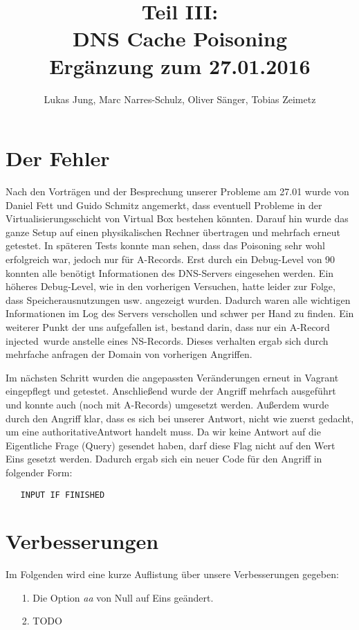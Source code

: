 \documentclass[10pt,a4paper]{article}
\author{Lukas Jung, Marc Narres-Schulz, Oliver Sänger, Tobias Zeimetz}
\title{Teil III: \\DNS Cache Poisoning \\Ergänzung zum 27.01.2016}
\begin{document}
\maketitle
\newpage

\section{Der Fehler}
Nach den Vorträgen und der Besprechung unserer Probleme am 27.01 wurde von Daniel Fett und Guido Schmitz angemerkt, dass eventuell Probleme in der Virtualisierungsschicht von Virtual Box bestehen könnten. Darauf hin wurde das ganze Setup auf einen physikalischen Rechner übertragen und mehrfach erneut getestet. In späteren Tests konnte man sehen, dass das Poisoning sehr wohl erfolgreich war, jedoch nur für A-Records. Erst durch ein Debug-Level von 90 konnten alle benötigt Informationen des DNS-Servers eingesehen werden. Ein höheres Debug-Level, wie in den vorherigen Versuchen, hatte leider zur Folge, dass Speicherausnutzungen usw. angezeigt wurden. Dadurch waren alle wichtigen Informationen im Log des Servers verschollen und schwer per Hand zu finden. Ein weiterer Punkt der uns aufgefallen ist, bestand darin, dass nur ein A-Record \glqq injected\grqq\ wurde anstelle eines NS-Records. Dieses verhalten ergab sich durch mehrfache anfragen der Domain von vorherigen Angriffen. 

Im nächsten Schritt wurden die angepassten Veränderungen erneut in Vagrant eingepflegt und getestet. Anschließend wurde der Angriff mehrfach ausgeführt und konnte auch (noch mit A-Records) umgesetzt werden. Außerdem wurde durch den Angriff klar, dass es sich bei unserer Antwort, nicht wie zuerst gedacht, um eine \glqq authoritative\grqq Antwort handelt muss. Da wir keine Antwort auf die Eigentliche Frage (Query) gesendet haben, darf diese Flag nicht auf den Wert Eins gesetzt werden. Dadurch ergab sich ein neuer Code für den Angriff in folgender Form:
\begin{center}
\begin{lstlisting}
   INPUT IF FINISHED
\end{lstlisting}
\end{center}

\section{Verbesserungen}
Im Folgenden wird eine kurze Auflistung über unsere Verbesserungen gegeben:
\begin{itemize}
	\item[1.]	Die Option \emph{aa} von Null auf Eins geändert. 
	\item[2.]	TODO
\end{itemize}
\end{document}
